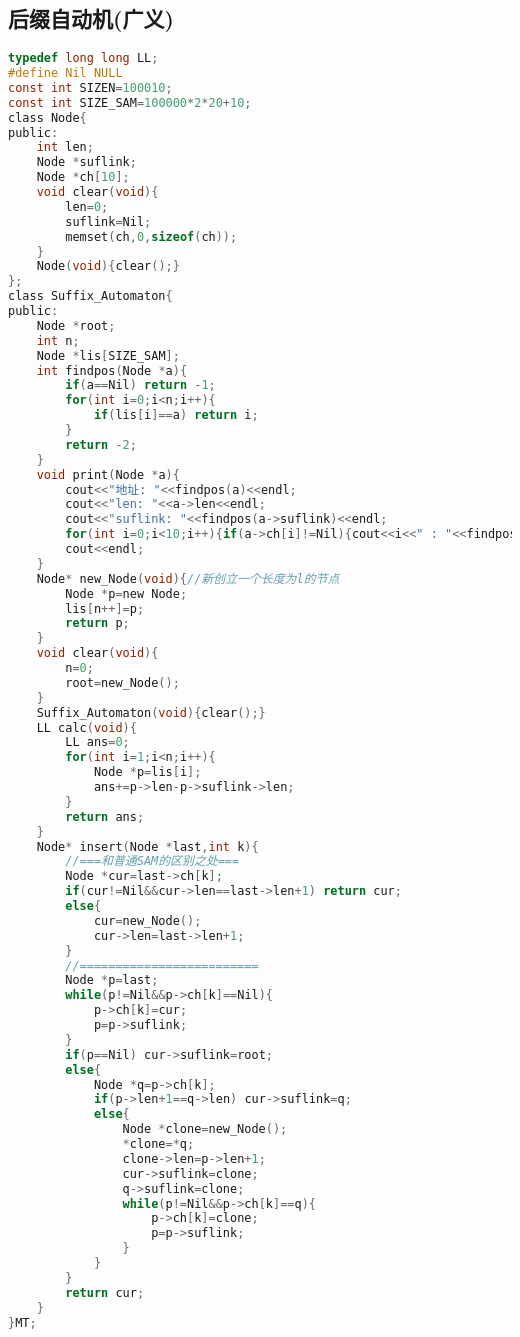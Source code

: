 \subsection{后缀自动机(广义)}
\begin{lstlisting}[language=C]
typedef long long LL;
#define Nil NULL
const int SIZEN=100010;
const int SIZE_SAM=100000*2*20+10;
class Node{
public:
	int len;
	Node *suflink;
	Node *ch[10];
	void clear(void){
		len=0;
		suflink=Nil;
		memset(ch,0,sizeof(ch));
	}
	Node(void){clear();}
};
class Suffix_Automaton{
public:
	Node *root;
	int n;
	Node *lis[SIZE_SAM];
	int findpos(Node *a){
		if(a==Nil) return -1;
		for(int i=0;i<n;i++){
			if(lis[i]==a) return i;
		}
		return -2;
	}
	void print(Node *a){
		cout<<"地址: "<<findpos(a)<<endl;
		cout<<"len: "<<a->len<<endl;
		cout<<"suflink: "<<findpos(a->suflink)<<endl;
		for(int i=0;i<10;i++){if(a->ch[i]!=Nil){cout<<i<<" : "<<findpos(a->ch[i])<<endl;}}
		cout<<endl;
	}
	Node* new_Node(void){//新创立一个长度为l的节点
		Node *p=new Node;
		lis[n++]=p;
		return p;
	}
	void clear(void){
		n=0;
		root=new_Node();
	}
	Suffix_Automaton(void){clear();}
	LL calc(void){
		LL ans=0;
		for(int i=1;i<n;i++){
			Node *p=lis[i];
			ans+=p->len-p->suflink->len;
		}
		return ans;
	}
	Node* insert(Node *last,int k){
		//===和普通SAM的区别之处===
		Node *cur=last->ch[k];
		if(cur!=Nil&&cur->len==last->len+1) return cur;
		else{
			cur=new_Node();
			cur->len=last->len+1;
		}
		//=========================
		Node *p=last;
		while(p!=Nil&&p->ch[k]==Nil){
			p->ch[k]=cur;
			p=p->suflink;
		}
		if(p==Nil) cur->suflink=root;
		else{
			Node *q=p->ch[k];
			if(p->len+1==q->len) cur->suflink=q;
			else{
				Node *clone=new_Node();
				*clone=*q;
				clone->len=p->len+1;
				cur->suflink=clone;
				q->suflink=clone;
				while(p!=Nil&&p->ch[k]==q){
					p->ch[k]=clone;
					p=p->suflink;
				}
			}
		}
		return cur;
	}
}MT;
\end{lstlisting}
